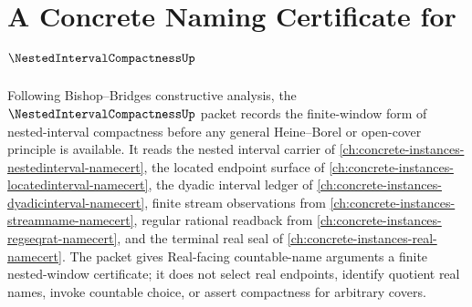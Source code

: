 \chapter{A Concrete Naming Certificate for $\NestedIntervalCompactnessUp$}
\label{ch:concrete-instances-nestedintervalcompactness-namecert}

Following Bishop--Bridges constructive analysis, the $\NestedIntervalCompactnessUp$ packet records the finite-window form of nested-interval compactness before any general Heine--Borel or open-cover principle is available. It reads the nested interval carrier of \autoref{ch:concrete-instances-nestedinterval-namecert}, the located endpoint surface of \autoref{ch:concrete-instances-locatedinterval-namecert}, the dyadic interval ledger of \autoref{ch:concrete-instances-dyadicinterval-namecert}, finite stream observations from \autoref{ch:concrete-instances-streamname-namecert}, regular rational readback from \autoref{ch:concrete-instances-regseqrat-namecert}, and the terminal real seal of \autoref{ch:concrete-instances-real-namecert}. The packet gives Real-facing countable-name arguments a finite nested-window certificate; it does not select real endpoints, identify quotient real names, invoke countable choice, or assert compactness for arbitrary covers.

